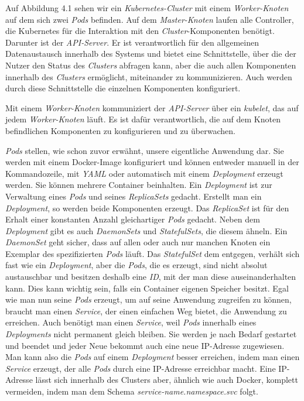 \documentclass[12pt,a4paper]{scrartcl}
\begin{document}
Auf Abbildung 4.1 sehen wir ein \emph{Kubernetes-Cluster} mit einem \emph{Worker-Knoten} auf dem sich zwei \emph{Pods} befinden. Auf dem \emph{Master-Knoten} laufen alle Controller, die Kubernetes für die Interaktion mit den \emph{Cluster}-Komponenten benötigt. Darunter ist der \emph{API-Server}. Er ist verantwortlich für den allgemeinen Datenaustausch innerhalb des Systems und bietet eine Schnittstelle, über die der Nutzer den Status des \emph{Clusters} abfragen kann, aber die auch allen Komponenten innerhalb des \emph{Clusters} ermöglicht, miteinander zu kommunizieren. Auch werden durch diese Schnittstelle die einzelnen Komponenten konfiguriert.

Mit einem \emph{Worker-Knoten} kommuniziert der \textit{API-Server} über ein \emph{kubelet}, das auf jedem \emph{Worker-Knoten} läuft. Es ist dafür verantwortlich, die auf dem Knoten befindlichen Komponenten zu konfigurieren und zu überwachen. 

\emph{Pods} stellen, wie schon zuvor erwähnt, unsere eigentliche Anwendung dar. Sie werden mit einem Docker-Image konfiguriert und können entweder manuell in der Kommandozeile, mit \emph{YAML} oder automatisch mit einem \emph{Deployment} erzeugt werden. Sie können mehrere Container beinhalten.
Ein \emph{Deployment} ist zur Verwaltung eines \emph{Pods} und seines \emph{ReplicaSets} gedacht. Erstellt man ein \emph{Deployment}, so werden beide Komponenten erzeugt.
Das \emph{ReplicaSet} ist für den Erhalt einer konstanten Anzahl gleichartiger \emph{Pods} gedacht. 
Neben dem \emph{Deployment} gibt es auch \emph{DaemonSets} und \emph{StatefulSets}, die diesem ähneln. 
Ein \emph{DaemonSet} geht sicher, dass auf allen oder auch nur manchen Knoten ein Exemplar des spezifizierten \emph{Pods} läuft. 
Das \emph{StatefulSet} dem entgegen, verhält sich fast wie ein \emph{Deployment}, aber die \emph{Pods}, die es erzeugt, sind nicht absolut austauschbar und besitzen deshalb eine \emph{ID}, mit der man diese auseinanderhalten kann. Dies kann wichtig sein, falls ein Container eigenen Speicher besitzt. 
Egal wie man nun seine \emph{Pods} erzeugt, um auf seine Anwendung zugreifen zu können, braucht man einen \emph{Service}, der einen einfachen Weg bietet, die Anwendung zu erreichen. Auch benötigt man einen \emph{Service}, weil \emph{Pods} innerhalb eines \emph{Deployments} nicht permanent gleich bleiben. Sie werden je nach Bedarf gestartet und beendet und jeder Neue bekommt auch eine neue IP-Adresse zugewiesen. Man kann also die \emph{Pods} auf einem \emph{Deployment} besser erreichen, indem man einen \emph{Service} erzeugt, der alle \emph{Pods} durch eine IP-Adresse erreichbar macht. Eine IP-Adresse lässt sich innerhalb des Clusters aber, ähnlich wie auch Docker, komplett vermeiden, indem man dem Schema \emph{service-name.namespace.svc} folgt.
\end{document}

